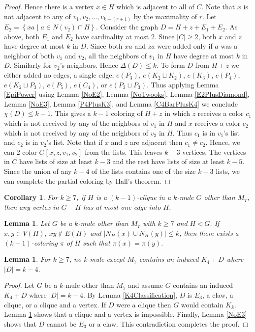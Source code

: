 \documentclass[12pt]{article}
\theoremstyle{plain}
\newtheorem{lem}[thm]{Lemma}
\newtheorem{cor}[thm]{Corollary}
\theoremstyle{definition}
\theoremstyle{remark}
\newcommand{\setbs}[2]{\left\{ #1 \mid #2 \right\}}
\newcommand{\card}[1]{\left|#1\right|}
\begin{document}
\begin{proof}
Hence there is a vertex $x \in H$ which is adjacent to all of $C$.  Note that $x$ is not adjacent to any of $v_1, v_2, \ldots, v_{k - (r + 1)}$ by the maximality of $r$. Let $E_2 = \setbs{xa}{a \in N(v_2) \cap H}$.  Consider the graph $D = H + z + E_1 + E_2$.  As above, both $E_1$ and $E_2$ have cardinality at most $2$.  Since $\card{C} \geq 2$, both $x$ and $z$ have degree at most $k$ in $D$.  Since both $xa$ and $za$ were added only if $a$ was a neighbor of both $v_1$ and $v_2$, all the neighbors of $v_1$ in $H$ have degree at most $k$ in $D$. Similarly for $v_2$'s neighbors.  Hence $\Delta(D) \leq k$. To form $D$ from $H + z$ we either added no edges, a single edge, $e(P_3)$, $e(K_2 \sqcup K_2)$, $e(K_3)$, $e(P_4)$, $e(K_2 \sqcup P_3)$, $e(P_5)$, $e(C_4)$, or $e(P_3 \sqcup P_3)$. Thus applying Lemma \ref{EpiPower} using Lemma \ref{NoE2}, Lemma \ref{NoTwooks}, Lemma \ref{E2PlusDiamond}, Lemma \ref{NoE3}, Lemma \ref{P4PlusK3}, and Lemma \ref{C4BarPlusK4} we conclude $\chi(D) \leq k - 1$. This gives a $k-1$ coloring of $H + z$ in which $z$ receives a color $c_1$ which is not received by any of the neighbors of $v_1$ in $H$ and
$x$ receives a color $c_2$ which is not received by any of the neighbors of $v_2$ in $H$.  Thus $c_1$ is in $v_1$'s list and $c_2$ is in $v_2$'s list.  
Note that if $x$ and $z$ are adjacent then $c_1 \neq c_2$. Hence, we can $2$-color $G[x,z,v_1,v_2]$ from the lists.  This leaves $k-3$ vertices.  
The vertices in $C$ have lists of size at least $k-3$ and the rest have lists of size at least $k-5$.  Since the union of any $k-4$ of the lists contains one of the size $k-3$ lists, we can complete the partial coloring by Hall's theorem.
\end{proof}

\begin{cor}\label{AtMostOneEdgeIn}
For $k \geq 7$, if $H$ is a $(k - 1)$-clique in a $k$-mule $G$ other than $M_7$, then any vertex in $G - H$ has at most one edge into $H$.
\end{cor}

\begin{lem}
Let $G$ be a $k$-mule other than $M_7$ with $k \geq 7$ and $H \lhd G$.  If $x, y \in V(H)$, $xy \not \in E(H)$ and  $\card{N_H(x) \cup N_H(y)} \leq k$, then there exists a $(k-1)$-coloring $\pi$ of $H$ such that $\pi(x) = \pi(y)$.
\end{lem}

\begin{lem}\label{K4sOut}
For $k \geq 7$, no $k$-mule except $M_7$ contains an induced $K_4 + D$ where $\card{D} = k - 4$.
\end{lem}
\begin{proof}
Let $G$ be a $k$-mule other than $M_7$ and assume $G$ contains an induced $K_4 + D$ where $\card{D} = k - 4$.  By Lemma \ref{K4Classification}, $D$ is $E_3$, a claw, a clique, or a clique and a vertex. If $D$ were a clique then $G$ would contain $K_k$. Lemma \ref{AtMostOneEdgeIn} shows that a clique and a vertex is impossible.  Finally, Lemma \ref{NoE3} shows that $D$ cannot be $E_3$ or a claw.  This contradiction completes the proof.
\end{proof}
\end{document}
